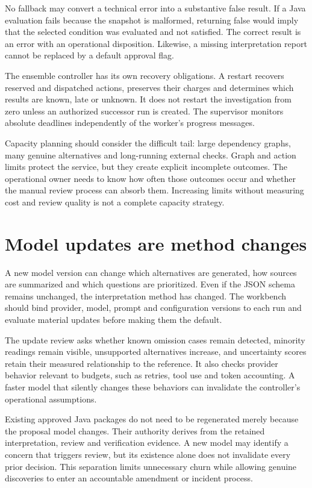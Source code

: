 \documentclass[12pt,a4paper,oneside,openany]{book}
\begin{document}
No fallback may convert a technical error into a substantive false result. If a
Java evaluation fails because the snapshot is malformed, returning false would
imply that the selected condition was evaluated and not satisfied. The correct
result is an error with an operational disposition. Likewise, a missing
interpretation report cannot be replaced by a default approval flag.

The ensemble controller has its own recovery obligations. A restart recovers
reserved and dispatched actions, preserves their charges and determines which
results are known, late or unknown. It does not restart the investigation from
zero unless an authorized successor run is created. The supervisor monitors
absolute deadlines independently of the worker's progress messages.

Capacity planning should consider the difficult tail: large dependency graphs,
many genuine alternatives and long-running external checks. Graph and action
limits protect the service, but they create explicit incomplete outcomes. The
operational owner needs to know how often those outcomes occur and whether the
manual review process can absorb them. Increasing limits without measuring cost
and review quality is not a complete capacity strategy.

\section{Model updates are method changes}
\label{merge:M10:10}


A new model version can change which alternatives are generated, how sources are
summarized and which questions are prioritized. Even if the JSON schema remains
unchanged, the interpretation method has changed. The workbench should bind
provider, model, prompt and configuration versions to each run and evaluate
material updates before making them the default.

The update review asks whether known omission cases remain detected, minority
readings remain visible, unsupported alternatives increase, and uncertainty scores
retain their measured relationship to the reference. It also checks provider
behavior relevant to budgets, such as retries, tool use and token accounting.
A faster model that silently changes these behaviors can invalidate the
controller's operational assumptions.

Existing approved Java packages do not need to be regenerated merely because the
proposal model changes. Their authority derives from the retained interpretation,
review and verification evidence. A new model may identify a concern that triggers
review, but its existence alone does not invalidate every prior decision. This
separation limits unnecessary churn while allowing genuine discoveries to enter
an accountable amendment or incident process.
\end{document}
